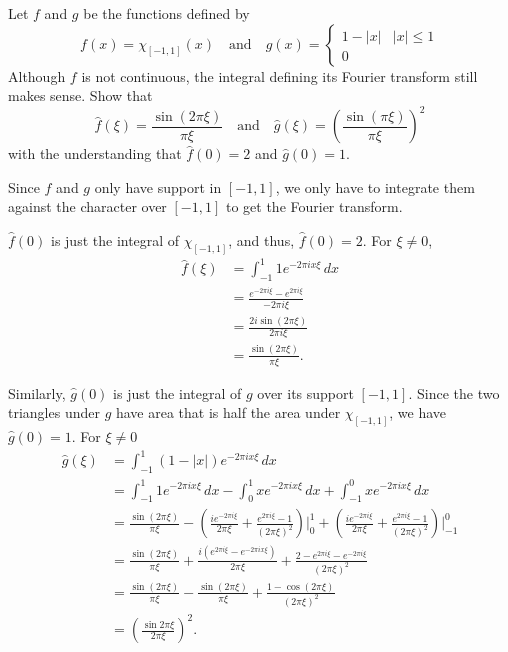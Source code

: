 \documentclass[12 pt, letterpaper]{hmcpset}
\begin{document}
\pagebreak

\begin{problem}[S \& S  \S 5.5 \#2]
	Let $f$ and $g$ be the functions defined by
	\[
		f(x) = \chi_{[-1, 1]}(x) \quad \text{and} \quad g(x) = \begin{cases}
			1 - \lvert x \rvert & \lvert x \rvert \le 1 \\
			0
		\end{cases}
	\]
	Although $f$ is not continuous, the integral defining its Fourier transform still makes sense. Show that
	\[
		\hat{f}(\xi) = \frac{\sin{(2 \pi \xi)}}{\pi \xi} \quad \text{and} \quad \hat{g}(\xi) = \left ( \frac{\sin{(\pi \xi)}}{\pi \xi} \right )^{2}
	\]
	with the understanding that $\hat{f}(0) = 2$ and $\hat{g}(0) = 1$.
\end{problem}

\begin{solution}
	Since $f$ and $g$ only have support in $[-1, 1]$, we only have to integrate them against the character over $[-1, 1]$ to get the Fourier transform.

	$\hat{f}(0)$ is just the integral of $\chi_{[-1, 1]}$, and thus, $\hat{f}(0) = 2$. For $\xi \neq 0$,
	\begin{align*}
		\hat{f}(\xi) & = \int_{-1}^{1} 1 e^{-2 \pi i x \xi} \, dx \\
			     & = \frac{e^{-2 \pi i \xi} - e^{2 \pi i \xi}}{-2 \pi i \xi} \\
			     & = \frac{2 i \sin{(2 \pi \xi)}}{2 \pi i \xi} \\
			     & = \frac{\sin{(2 \pi \xi)}}{\pi \xi}.
	\end{align*}

	Similarly, $\hat{g}(0)$ is just the integral of $g$ over its support $[-1, 1]$. Since the two triangles under $g$ have area that is half the area under $\chi_{[-1, 1]}$, we have $\hat{g}(0) = 1$. For $\xi \neq 0$
	\begin{align*}
		\hat{g}(\xi) & = \int_{-1}^{1} (1 - \lvert x \rvert) e^{-2 \pi i x \xi} \, dx \\
			     & = \int_{-1}^{1} 1 e^{-2 \pi i x \xi} \, dx - \int_{0}^{1} x e^{-2 \pi i x \xi} \, dx + \int_{-1}^{0} x e^{-2 \pi i x \xi} \, dx \\
			     & = \frac{\sin{(2 \pi \xi)}}{\pi \xi} - \left ( \frac{i e^{-2 \pi i \xi}}{2 \pi \xi} + \frac{e^{2 \pi i \xi} - 1}{(2 \pi \xi)^{2}} \right ) \Big \vert_{0}^{1} + \left ( \frac{i e^{-2 \pi i \xi}}{2 \pi \xi} + \frac{e^{2 \pi i \xi} - 1}{(2 \pi \xi)^{2}} \right ) \Big \vert_{-1}^{0} \\
			     & = \frac{\sin{(2 \pi \xi)}}{\pi \xi} + \frac{i (e^{2 \pi i \xi} - e^{- 2 \pi i x \xi})}{2 \pi \xi} + \frac{2 - e^{2 \pi i \xi} - e^{-2 \pi i \xi}}{(2 \pi \xi)^{2}} \\
			     & = \frac{\sin{(2 \pi \xi)}}{\pi \xi} - \frac{\sin{(2 \pi \xi)}}{\pi \xi} + \frac{1 - \cos{(2 \pi \xi)}}{(2 \pi \xi)^{2}} \\
			     & = \left ( \frac{\sin{2 \pi \xi}}{2 \pi \xi} \right )^{2}.
	\end{align*}
\end{solution}
\end{document}
